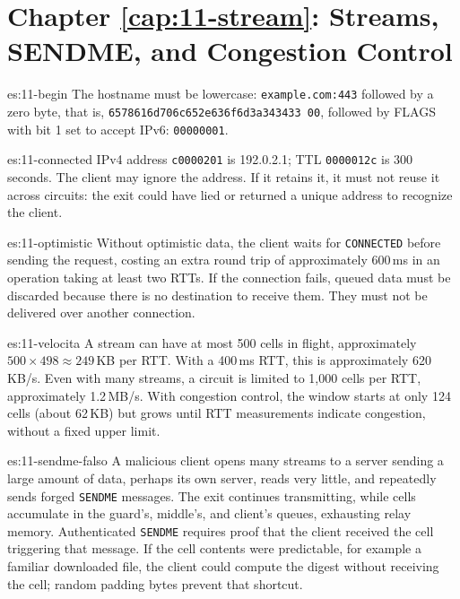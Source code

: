 \section*{Chapter \ref{cap:11-stream}: Streams, SENDME, and Congestion Control}

\begin{soluzione}{es:11-begin}
The hostname must be lowercase: \texttt{example.com:443} followed by a zero byte, that is, \texttt{6578616d706c652e636f6d3a343433 00}, followed by FLAGS with bit 1 set to accept IPv6: \texttt{00000001}.
\end{soluzione}

\begin{soluzione}{es:11-connected}
IPv4 address \texttt{c0000201} is 192.0.2.1; TTL \texttt{0000012c} is 300 seconds. The client may ignore the address. If it retains it, it must not reuse it across circuits: the exit could have lied or returned a unique address to recognize the client.
\end{soluzione}

\begin{soluzione}{es:11-optimistic}
Without optimistic data, the client waits for \texttt{CONNECTED} before sending the request, costing an extra round trip of approximately 600\,ms in an operation taking at least two RTTs. If the connection fails, queued data must be discarded because there is no destination to receive them. They must not be delivered over another connection.
\end{soluzione}

\begin{soluzione}{es:11-velocita}
A stream can have at most 500 cells in flight, approximately $500 \times 498 \approx 249$\,KB per RTT. With a 400\,ms RTT, this is approximately 620\,KB/s. Even with many streams, a circuit is limited to 1,000 cells per RTT, approximately 1.2\,MB/s. With congestion control, the window starts at only 124 cells (about 62\,KB) but grows until RTT measurements indicate congestion, without a fixed upper limit.
\end{soluzione}

\begin{soluzione}{es:11-sendme-falso}
A malicious client opens many streams to a server sending a large amount of data, perhaps its own server, reads very little, and repeatedly sends forged \texttt{SENDME} messages. The exit continues transmitting, while cells accumulate in the guard's, middle's, and client's queues, exhausting relay memory. Authenticated \texttt{SENDME} requires proof that the client received the cell triggering that message. If the cell contents were predictable, for example a familiar downloaded file, the client could compute the digest without receiving the cell; random padding bytes prevent that shortcut.
\end{soluzione}

